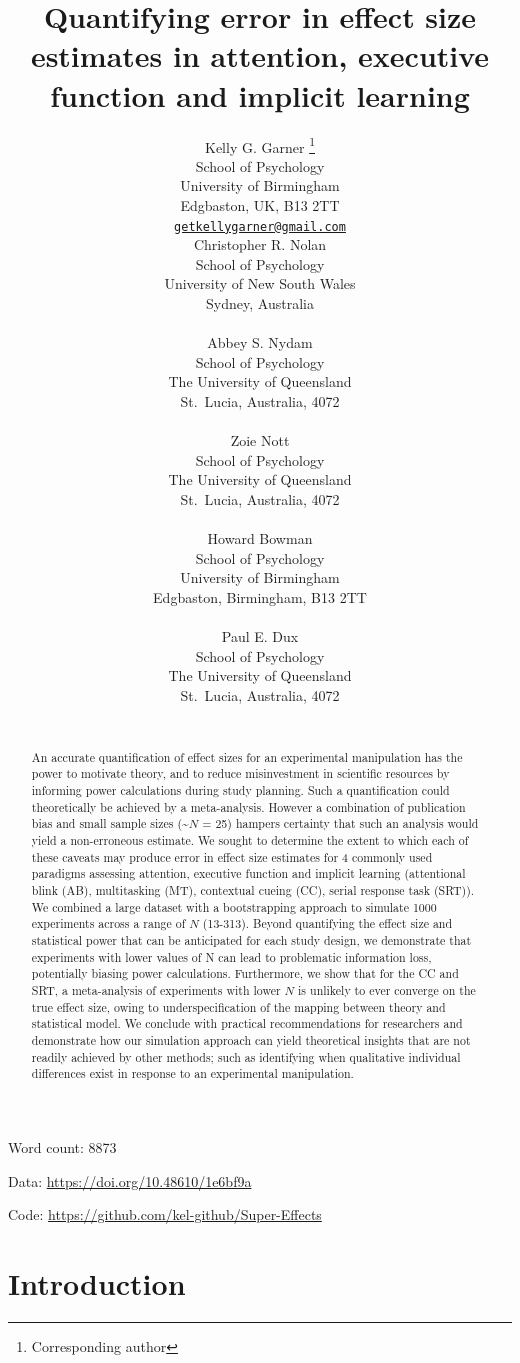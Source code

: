 \documentclass{article}
\title{Quantifying error in effect size estimates in attention, executive function and implicit learning}
\author{
    Kelly G. Garner
    \thanks{Corresponding author}
   \\
    School of Psychology \\
    University of Birmingham \\
  Edgbaston, UK, B13 2TT \\
  \texttt{\href{mailto:getkellygarner@gmail.com}{\nolinkurl{getkellygarner@gmail.com}}} \\
   \And
    Christopher R. Nolan
   \\
    School of Psychology \\
    University of New South Wales \\
  Sydney, Australia \\
  \texttt{} \\
   \And
    Abbey S. Nydam
   \\
    School of Psychology \\
    The University of Queensland \\
  St.~Lucia, Australia, 4072 \\
  \texttt{} \\
   \And
    Zoie Nott
   \\
    School of Psychology \\
    The University of Queensland \\
  St.~Lucia, Australia, 4072 \\
  \texttt{} \\
   \And
    Howard Bowman
   \\
    School of Psychology \\
    University of Birmingham \\
  Edgbaston, Birmingham, B13 2TT \\
  \texttt{} \\
   \And
    Paul E. Dux
   \\
    School of Psychology \\
    The University of Queensland \\
  St.~Lucia, Australia, 4072 \\
  \texttt{} \\
  }
\begin{document}
\maketitle


\begin{abstract}
An accurate quantification of effect sizes for an experimental manipulation has the power to motivate theory, and to reduce misinvestment in scientific resources by informing power calculations during study planning. Such a quantification could theoretically be achieved by a meta-analysis. However a combination of publication bias and small sample sizes (\textasciitilde{}\(N\) = 25) hampers certainty that such an analysis would yield a non-erroneous estimate. We sought to determine the extent to which each of these caveats may produce error in effect size estimates for 4 commonly used paradigms assessing attention, executive function and implicit learning (attentional blink (AB), multitasking (MT), contextual cueing (CC), serial response task (SRT)). We combined a large dataset with a bootstrapping approach to simulate 1000 experiments across a range of \(N\) (13-313). Beyond quantifying the effect size and statistical power that can be anticipated for each study design, we demonstrate that experiments with lower values of N can lead to problematic information loss, potentially biasing power calculations. Furthermore, we show that for the CC and SRT, a meta-analysis of experiments with lower \(N\) is unlikely to ever converge on the true effect size, owing to underspecification of the mapping between theory and statistical model. We conclude with practical recommendations for researchers and demonstrate how our simulation approach can yield theoretical insights that are not readily achieved by other methods; such as identifying when qualitative individual differences exist in response to an experimental manipulation.
\end{abstract}


Word count: 8873

Data: \url{https://doi.org/10.48610/1e6bf9a}

Code: \url{https://github.com/kel-github/Super-Effects}

\clearpage

\hypertarget{introduction}{%
\section{Introduction}\label{introduction}}
\end{document}
